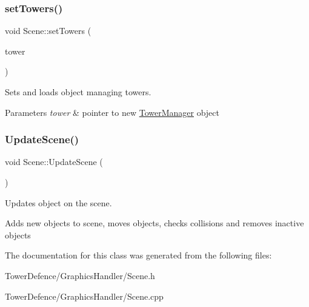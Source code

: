 \subsubsection{\texorpdfstring{set\+Towers()}{setTowers()}}
{\footnotesize\ttfamily void Scene\+::set\+Towers (\begin{DoxyParamCaption}\item[{\mbox{\hyperlink{class_tower_manager}{Tower\+Manager}} $\ast$}]{tower }\end{DoxyParamCaption})}



Sets and loads object managing towers. 


\begin{DoxyParams}{Parameters}
{\em tower} & pointer to new \mbox{\hyperlink{class_tower_manager}{Tower\+Manager}} object \\
\hline
\end{DoxyParams}
\mbox{\label{class_scene_a0cd0a324b6fd0d560ce223e249be0828}} 
\subsubsection{\texorpdfstring{Update\+Scene()}{UpdateScene()}}
{\footnotesize\ttfamily void Scene\+::\+Update\+Scene (\begin{DoxyParamCaption}{ }\end{DoxyParamCaption})}



Updates object on the scene. 

Adds new objects to scene, moves objects, checks collisions and removes inactive objects 

The documentation for this class was generated from the following files\+:\begin{DoxyCompactItemize}
\item 
Tower\+Defence/\+Graphics\+Handler/Scene.\+h\item 
Tower\+Defence/\+Graphics\+Handler/Scene.\+cpp\end{DoxyCompactItemize}

